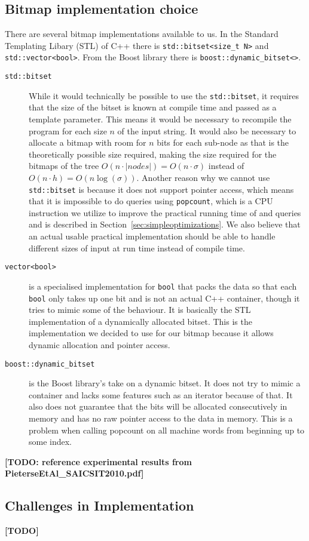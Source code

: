 \subsection{Bitmap implementation choice}
There are several bitmap implementations available to us. In the Standard Templating Libary (STL) of C++ there is \texttt{std::bitset<size\_t N>} and \texttt{std::vector<bool>}. From the Boost library there is \texttt{boost::dynamic\_bitset<>}.
\begin{description}
\item[\texttt{std::bitset}] While it would technically be possible to use the \texttt{std::bitset}, it requires that the size of the bitset is known at compile time and passed as a template parameter. This means it would be necessary to recompile the program for each size $n$ of the input string. 
It would also be necessary to allocate a bitmap with room for $n$ bits for each sub-node as that is the theoretically possible size required, making the size required for the bitmaps of the tree $O(n \cdot |nodes|) = O(n \cdot \sigma)$ instead of $O(n \cdot h) = O(n\log(\sigma))$.
Another reason why we cannot use \texttt{std::bitset} is because it does not support pointer access, which means that it is impossible to do queries using \texttt{popcount}, which is a CPU instruction we utilize to improve the practical running time of  and  queries and is described in Section~\ref{sec:simpleoptimizations}.
We also believe that an actual usable practical implementation should be able to handle different sizes of input at run time instead of compile time. 

\item[\texttt{vector<bool>}] is a specialised implementation for \texttt{bool} that packs the data so that each \texttt{bool} only takes up one bit and is not an actual C++ container, though it tries to mimic some of the behaviour. 
It is basically the STL implementation of a dynamically allocated bitset. This is the implementation we decided to use for our bitmap because it allows dynamic allocation and pointer access.

\item[\texttt{boost::dynamic\_bitset}] is the Boost library's take on a dynamic bitset. 
It does not try to mimic a container and lacks some features such as an iterator because of that. 
It also does not guarantee that the bits will be allocated consecutively in memory and has no raw pointer access to the data in memory. 
This is a problem when calling popcount on all machine words from beginning up to some index.
\end{description}

\textbf{[TODO: reference experimental results from PieterseEtAl\_SAICSIT2010.pdf]}

\subsection{Challenges in Implementation}
\textbf{[TODO]}